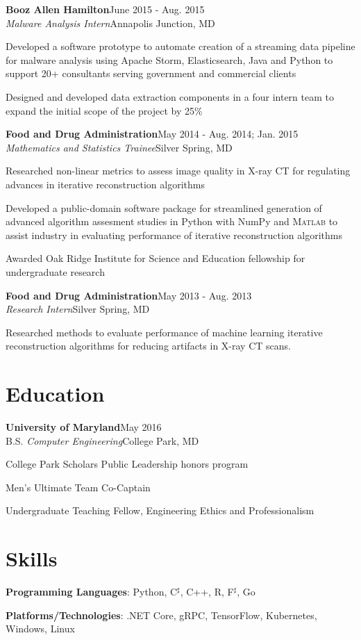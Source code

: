 \documentclass[letterpaper,11pt]{article}
\def \jobskip{1em}
\newcommand{\resentry}[6]{
\large{\sffamily\textbf{#1}}\hfill{\rmfamily\normalsize\textcolor{faded}{#2}} \\
\normalsize{#3}\hfill{\textcolor{faded}{\normalsize#4}}\\
\normalsize{#5}
\footnotesize{#6}
}
\newcommand{\resitem}[1]{\normalsize{\item #1}}
\begin{document}
\vspace{\jobskip}
\resentry{{Booz Allen Hamilton}}{June 2015 \-- Aug. 2015}{\emph{Malware Analysis Intern}}{Annapolis Junction, MD}{\vspace{-1em}}
{ 
      \begin{resumeitemize}
	\item{Developed a software prototype to automate creation of a streaming data pipeline for malware analysis using Apache Storm, Elasticsearch, Java and Python to support 20+ consultants serving government and commercial clients}
	\item{Designed and developed data extraction components in a four intern team to expand the initial scope of the project by 25\%}
          \end{resumeitemize}
}
\vspace{\jobskip}
\resentry{{Food and Drug Administration}}{May 2014 \-- Aug. 2014; Jan. 2015}{\emph{Mathematics and Statistics Trainee}}{Silver Spring, MD}{\vspace{-1em}}
   { 
      \begin{resumeitemize}
	 \item{Researched non-linear metrics to assess image quality in {X-ray CT} for regulating advances in iterative reconstruction algorithms}
            \item{Developed a public-domain software package for streamlined generation of advanced algorithm assesment studies in Python with NumPy and \textsc{Matlab} to assist industry in evaluating performance of iterative reconstruction algorithms}
	 \item{Awarded Oak Ridge Institute for Science and Education fellowship for undergraduate research}
          \end{resumeitemize}
   }
\vspace{\jobskip}
\resentry{{Food and Drug Administration}}{May 2013 \-- Aug. 2013}{\emph{Research Intern}}{Silver Spring, MD}{\vspace{-1em}}
   { 
\begin{resumeitemize}
\item{Researched methods to evaluate performance of machine learning iterative reconstruction algorithms for reducing artifacts in {X-ray CT} scans.}
\end{resumeitemize}
   }
\section*{Education}
\resentry{{University of Maryland}}{May 2016}{B.S. \emph{Computer Engineering}}{College Park, MD}{\vspace{-1em}}{\footnotesize
 \begin{resumeitemize}
            \item{{College Park Scholars Public Leadership honors program}}
	 \item{Men's Ultimate Team Co-Captain}
	 \item{Undergraduate Teaching Fellow, Engineering Ethics and Professionalism}
          \end{resumeitemize}
}
\section*{Skills}
\begin{skillsitemize} 
\resitem{\textbf{Programming Languages}: Python, C$^\sharp$, C++, R, F$^\sharp$, Go}
\resitem{\textbf{Platforms/Technologies}: .NET Core, gRPC, TensorFlow, Kubernetes, Windows, Linux}
\end{skillsitemize}
\end{document}
